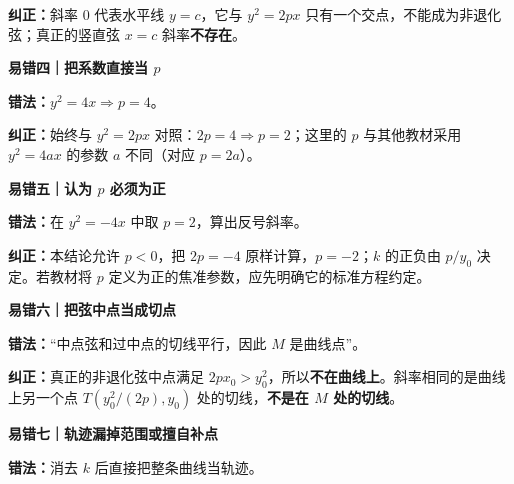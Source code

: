 \begin{trapbox}
\par\noindent\textbf{纠正：}斜率 $0$ 代表水平线 $y=c$，它与 $y^2=2px$ 只有一个交点，不能成为非退化弦；真正的竖直弦 $x=c$ 斜率\textbf{不存在}。
\par\medskip
\begin{minipage}{\linewidth}
\noindent
\textbf{\textcolor{CTrap}{易错四｜把系数直接当 $p$}}\par\nobreak\smallskip
\par\noindent\textbf{错法：}$y^2=4x\Rightarrow p=4$。\par
\end{minipage}
\par

\par\noindent\textbf{纠正：}始终与 $y^2=2px$ 对照：$2p=4\Rightarrow p=2$；这里的 $p$ 与其他教材采用 $y^2=4ax$ 的参数 $a$ 不同（对应 $p=2a$）。
\par\medskip
\begin{minipage}{\linewidth}
\noindent
\textbf{\textcolor{CTrap}{易错五｜认为 $p$ 必须为正}}\par\nobreak\smallskip
\par\noindent\textbf{错法：}在 $y^2=-4x$ 中取 $p=2$，算出反号斜率。\par
\end{minipage}
\par

\par\noindent\textbf{纠正：}本结论允许 $p<0$，把 $2p=-4$ 原样计算，$p=-2$；$k$ 的正负由 $p/y_0$ 决定。若教材将 $p$ 定义为正的焦准参数，应先明确它的标准方程约定。
\par\medskip
\begin{minipage}{\linewidth}
\noindent
\textbf{\textcolor{CTrap}{易错六｜把弦中点当成切点}}\par\nobreak\smallskip
\par
\begin{minipage}{\linewidth}
\begin{center}

\end{center}
\end{minipage}\par
\end{minipage}
\par

\par


\par\noindent\textbf{错法：}“中点弦和过中点的切线平行，因此 $M$ 是曲线点”。
\par\noindent\textbf{纠正：}真正的非退化弦中点满足 $2px_0>y_0^2$，所以\textbf{不在曲线上}。斜率相同的是曲线上另一个点 $T(y_0^2/(2p),y_0)$ 处的切线，\textbf{不是在 $M$ 处的切线}。
\par\medskip
\begin{minipage}{\linewidth}
\noindent
\textbf{\textcolor{CTrap}{易错七｜轨迹漏掉范围或擅自补点}}\par\nobreak\smallskip
\par\noindent\textbf{错法：}消去 $k$ 后直接把整条曲线当轨迹。\par
\end{minipage}
\par


\end{trapbox}
